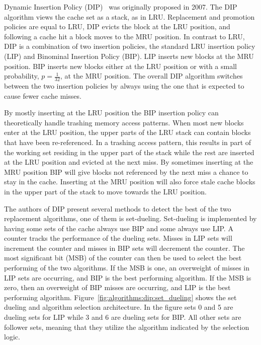 Dynamic Insertion Policy (DIP)~\cite{Qureshi2007} was originally proposed in 2007.
The DIP algorithm views the cache set as a stack, as in LRU.
Replacement and promotion policies are equal to LRU, DIP evicts the block at the LRU position, and following a cache hit a block moves to the MRU position.
In contrast to LRU, DIP is a combination of two insertion policies, the standard LRU insertion policy (LIP) and Binominal Insertion Policy (BIP).
LIP inserts new blocks at the MRU position.
BIP inserts new blocks either at the LRU position or with a small probability, $p = \frac{1}{32}$, at the MRU position. 
The overall DIP algorithm switches between the two insertion policies by always using the one that is expected to cause fewer cache misses.

By mostly inserting at the LRU position the BIP insertion policy can theoretically handle trashing memory access patterns.
When most new blocks enter at the LRU position, the upper parts of the LRU stack can contain blocks that have been re-referenced.
In a trashing access pattern, this results in part of the working set residing in the upper part of the stack while the rest are inserted at the LRU position and evicted at the next miss.
By sometimes inserting at the MRU position BIP will give blocks not referenced by the next miss a chance to stay in the cache. 
Inserting at the MRU position will also force stale cache blocks in the upper part of the stack to move towards the LRU position.

The authors of DIP present several methods to detect the best of the two replacement algorithms, one of them is set-dueling.
Set-dueling is implemented by having some sets of the cache always use BIP and some always use LIP.
A counter tracks the performance of the dueling sets.
Misses in LIP sets will increment the counter and misses in BIP sets will decrement the counter.
The most significant bit (MSB) of the counter can then be used to select the best performing of the two algorithms.
If the MSB is one, an overweight of misses in LIP sets are occurring, and BIP is the best performing algorithm. 
If the MSB is zero, then an overweight of BIP misses are occurring, and LIP is the best performing algorithm.
Figure~\ref{fig:algorithms:dip:set_dueling} shows the set dueling and algorithm selection architecture.
In the figure sets 0 and 5 are dueling sets for LIP while 3 and 6 are dueling sets for BIP.
All other sets are follower sets, meaning that they utilize the algorithm indicated by the selection logic.

